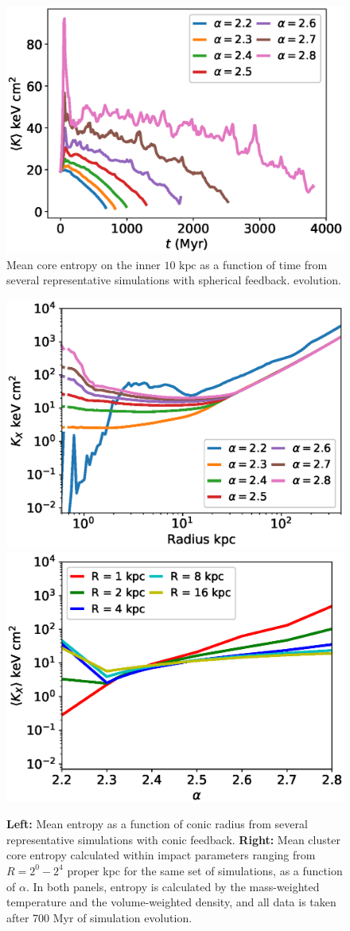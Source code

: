 \documentclass[iop,apjl, twocolappendix]{emulateapj}   %
\begin{document}
\begin{figure}
  \begin{center}
    \includegraphics[width=0.9\linewidth]{figures/spherical/avgCoreEntropies.eps}
  \end{center}
  \caption{Mean core entropy on the inner $10 \text{ kpc}$ as
  a function of time from several representative simulations with spherical feedback.  evolution.}
\end{figure}

\begin{figure}
	\begin{center}
		\includegraphics[width=0.49\linewidth]{figures/conic/entropyVradius.eps}
		\includegraphics[width=0.49\linewidth]{figures/conic/entropyValpha.eps}
	\end{center}
	\caption{
		\textbf{Left:}  Mean entropy as a function of conic radius from
	several representative simulations with conic feedback.  \textbf{Right:} Mean cluster core
	entropy calculated within impact parameters ranging from $R = 2^0 - 2^4$ proper
	kpc for the same set of simulations, as a function of $\alpha$.  In both
	panels, entropy is calculated by the mass-weighted temperature and the
	volume-weighted density, and all data is taken after 700 Myr of simulation
	evolution.}
\end{figure}
\end{document}
